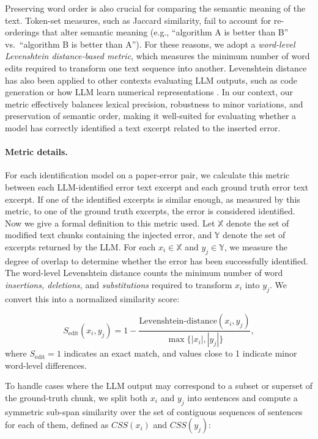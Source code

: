 \documentclass{article}
\begin{document}
Preserving word order is also crucial for comparing the semantic meaning of the text. Token-set measures, such as Jaccard similarity, fail to account for re-orderings that alter semantic meaning (e.g., “algorithm A is better than B” vs.\ “algorithm B is better than A”). For these reasons, we adopt a \textit{word-level Levenshtein distance-based metric}, which measures the minimum number of word edits required to transform one text sequence into another. Levenshtein distance has also been applied to other contexts evaluating LLM outputs, such as code generation \citep{pan2025} or how LLM learn numerical representations \citep{marjieh2025}. In our context, our metric effectively balances lexical precision, robustness to minor variations, and preservation of semantic order, making it well-suited for evaluating whether a model has correctly identified a text excerpt related to the inserted error. 

\paragraph{Metric details.} For each identification model on a paper-error pair, we calculate this metric between each LLM-identified error text excerpt and each ground truth error text excerpt. If one of the identified excerpts is similar enough, as measured by this metric, to one of the ground truth excerpts, the error is considered identified. Now we give a formal definition to this metric used. Let $\mathbb{X}$ denote the set of modified text chunks containing the injected error, and $\mathbb{Y}$ denote the set of excerpts returned by the LLM. For each $x_i \in \mathbb{X}$ and $y_j \in \mathbb{Y}$, we measure the degree of overlap to determine whether the error has been successfully identified. The word-level Levenshtein distance \citep{levenshtein1966} counts the minimum number of word \textit{insertions, deletions,} and \textit{substitutions} required to transform $x_i$ into $y_j$. We convert this into a normalized similarity score:

\[
S_{\mathrm{edit}}(x_i, y_j) = 1 - \frac{\text{Levenshtein-distance}(x_i, y_j)}{\max\{|x_i|, |y_j|\}},
\]
where $S_{\mathrm{edit}} = 1$ indicates an exact match, and values close to 1 indicate minor word-level differences.

To handle cases where the LLM output may correspond to a subset or superset of the ground-truth chunk, we split both $x_i$ and $y_j$ into sentences and compute a symmetric sub-span similarity over the set of contiguous sequences of sentences for each of them, defined as $CSS(x_i)$ and $CSS(y_j)$:
\end{document}
